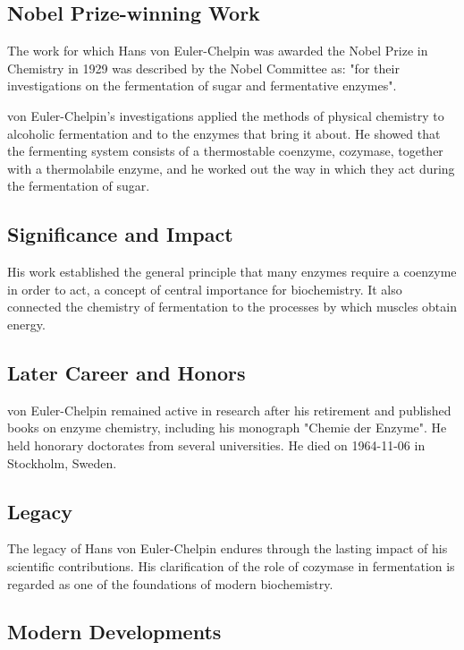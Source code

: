 \subsection*{Nobel Prize-winning Work}

The work for which Hans von Euler-Chelpin was awarded the Nobel Prize in Chemistry in 1929 was described by the Nobel Committee as: "for their investigations on the fermentation of sugar and fermentative enzymes".

von Euler-Chelpin's investigations applied the methods of physical chemistry to alcoholic fermentation and to the enzymes that bring it about.
He showed that the fermenting system consists of a thermostable coenzyme, cozymase, together with a thermolabile enzyme, and he worked out the way in which they act during the fermentation of sugar.

\subsection*{Significance and Impact}

His work established the general principle that many enzymes require a coenzyme in order to act, a concept of central importance for biochemistry.
It also connected the chemistry of fermentation to the processes by which muscles obtain energy.

\subsection*{Later Career and Honors}

von Euler-Chelpin remained active in research after his retirement and published books on enzyme chemistry, including his monograph "Chemie der Enzyme".
He held honorary doctorates from several universities.
He died on 1964-11-06 in Stockholm, Sweden.

\subsection*{Legacy}

The legacy of Hans von Euler-Chelpin endures through the lasting impact of his scientific contributions.
His clarification of the role of cozymase in fermentation is regarded as one of the foundations of modern biochemistry.

\subsection*{Modern Developments}

